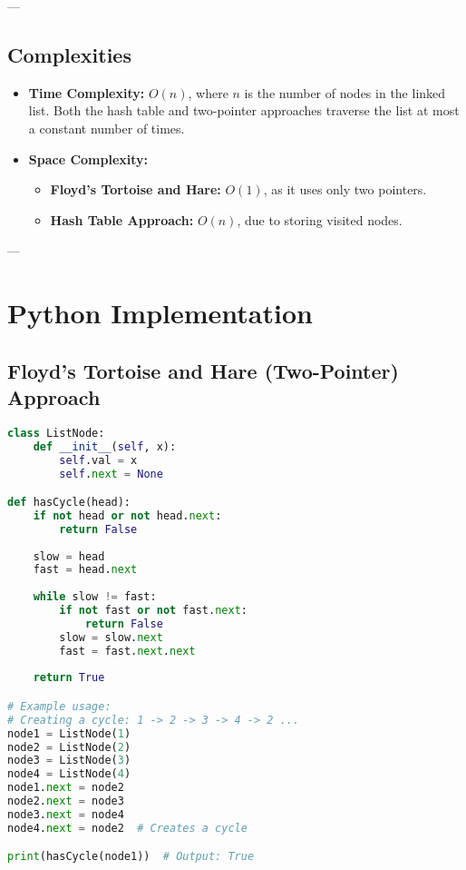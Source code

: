 ---

\subsection*{Complexities}
\begin{itemize}
    \item \textbf{Time Complexity:} \(O(n)\), where \(n\) is the number of nodes in the linked list. Both the hash table and two-pointer approaches traverse the list at most a constant number of times.
    \item \textbf{Space Complexity:}
    \begin{itemize}
        \item \textbf{Floyd’s Tortoise and Hare:} \(O(1)\), as it uses only two pointers.
        \item \textbf{Hash Table Approach:} \(O(n)\), due to storing visited nodes.
    \end{itemize}
\end{itemize}

---

\section*{Python Implementation}

\subsection*{Floyd’s Tortoise and Hare (Two-Pointer) Approach}
\begin{fullwidth}
\begin{lstlisting}[language=Python]
class ListNode:
    def __init__(self, x):
        self.val = x
        self.next = None

def hasCycle(head):
    if not head or not head.next:
        return False
    
    slow = head
    fast = head.next
    
    while slow != fast:
        if not fast or not fast.next:
            return False
        slow = slow.next
        fast = fast.next.next
    
    return True

# Example usage:
# Creating a cycle: 1 -> 2 -> 3 -> 4 -> 2 ...
node1 = ListNode(1)
node2 = ListNode(2)
node3 = ListNode(3)
node4 = ListNode(4)
node1.next = node2
node2.next = node3
node3.next = node4
node4.next = node2  # Creates a cycle

print(hasCycle(node1))  # Output: True
\end{lstlisting}
\end{fullwidth}

